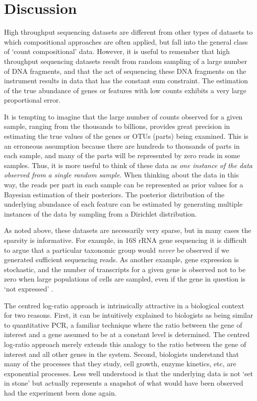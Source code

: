 \documentclass[article]{ajs}\usepackage[]{graphicx}\usepackage[]{color}
\begin{document}
\section{Discussion}
\vskip-0.25cm 

High throughput sequencing datasets are  different from other types of datasets to which compositional approaches are often applied, but fall into the general class of `count compositional' data. However, it is useful to remember that high throughput sequencing datasets result from random sampling of a large number of DNA fragments, and that the act of sequencing these DNA fragments on the instrument results in data that has the constant sum constraint. The estimation of the true abundance of genes or features with low counts exhibits a very large proportional error.  

It is tempting to imagine that the large number of counts observed for a given sample, ranging from the thousands to billions, provides great precision in estimating the true values of the genes or OTUs (parts) being examined. This is an erroneous assumption because there are hundreds to thousands of parts in each sample, and many of the parts will be represented by zero reads in some samples. Thus, it is more useful to think of these data as \emph{one instance of the data observed from a single random sample}. When thinking about the data in this way, the reads per part in each sample can be represented as prior values for a Bayesian estimation of their posteriors. The  posterior distribution of the underlying abundance of each feature can be estimated by generating multiple instances of the data by sampling from a Dirichlet distribution. 

As noted above, these datasets are necessarily very sparse, but in many cases the sparsity is informative. For example, in 16S rRNA gene sequencing it is difficult to argue that a particular taxonomic group would \emph{never} be observed if we generated sufficient sequencing reads. As another example, gene expression is stochastic, and the number of transcripts for a given gene is observed not to be zero when large populations of cells are sampled, even if the gene in question is `not expressed' \citep{Munsky:2012aa}. 

The centred log-ratio approach is intrinsically attractive in a biological context for two reasons. First, it can be intuitively explained to biologists as being similar to quantitative PCR, a familiar technique where the ratio between the gene of interest and a gene assumed to be at a constant level is determined. The centred log-ratio approach merely extends this analogy to the ratio between the gene of interest and all other genes in the system. Second, biologists understand that many of the processes that they study, cell growth, enzyme kinetics, etc, are exponential processes. Less well understood is that the underlying data is not `set in stone' but actually represents a snapshot of what would have been observed had the experiment been done again.  
\end{document}

